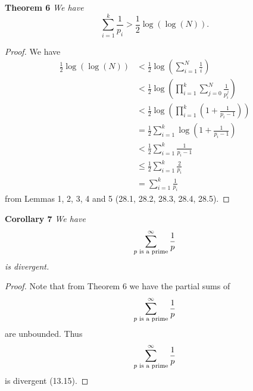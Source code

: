 \documentclass{article}
\begin{document}
\begin{flushleft}
\textbf{Theorem 6}
\textsl{We have
\[
\sum_{i=1}^k \frac{1}{p_i} > \frac{1}{2} \log ( \log ( N ) ).
\]}
\begin{proof}
We have
\begin{align*}
\frac{1}{2} \log (\log(N)) &< \frac{1}{2} \log \left ( \sum_{i=1}^N \frac{1}{i} \right ) \\
					&< \frac{1}{2} \log \left ( \prod_{i=1}^k \sum_{j=0}^N \frac{1}{p_i^j} \right ) \\
					&< \frac{1}{2} \log \left ( \prod_{i=1}^k \left ( 1 + \frac{1}{p_i-1} \right ) \right ) \\
					&= \frac{1}{2} \sum_{i=1}^k \log \left ( 1 + \frac{1}{p_i-1} \right ) \\
					&< \frac{1}{2} \sum_{i=1}^k \frac{1}{p_i-1} \\
					&\leq \frac{1}{2} \sum_{i=1}^k \frac{2}{p_i} \\
					&= \sum_{i=1}^k \frac{1}{p_i}
\end{align*}
from Lemmas 1, 2, 3, 4 and 5 (28.1, 28.2, 28.3, 28.4, 28.5).
\end{proof}

\textbf{Corollary 7}
\textsl{We have
\[
\sum_{\textup{$p$ is a prime}}^{\infty} \frac{1}{p}
\]
is divergent.}
\begin{proof}
Note that from Theorem 6 we have the partial sums of
\[
\sum_{\textup{$p$ is a prime}}^{\infty} \frac{1}{p}
\]
are unbounded. Thus
\[
\sum_{\textup{$p$ is a prime}}^{\infty} \frac{1}{p}
\]
is divergent (13.15).
\end{proof}

\end{flushleft}
\end{document}
